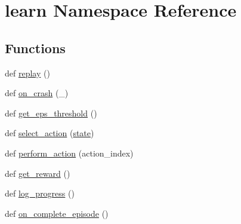 \hypertarget{namespacelearn}{}\section{learn Namespace Reference}
\label{namespacelearn}
\subsection*{Functions}
\begin{DoxyCompactItemize}
\item 
def \hyperlink{namespacelearn_a39889cb816ab9a6bc7a528ee4c8784db}{replay} ()
\item 
def \hyperlink{namespacelearn_ae0746217c771a7b43503a88b0a55c8c5}{on\+\_\+crash} (\+\_\+)
\item 
def \hyperlink{namespacelearn_ae05616fc87e970aa8283fc7223fb8753}{get\+\_\+eps\+\_\+threshold} ()
\item 
def \hyperlink{namespacelearn_a5dbccbd480a1c02fe1e4c1fc67a066cc}{select\+\_\+action} (\hyperlink{namespacelearn_a48d8007f4bd73948e2b7683cd736edfc}{state})
\item 
def \hyperlink{namespacelearn_a2734a6ee9a0aed781d4db3abc7d206fb}{perform\+\_\+action} (action\+\_\+index)
\item 
def \hyperlink{namespacelearn_a6b3b3e6dbffdbc5bbd5d685d582e66c6}{get\+\_\+reward} ()
\item 
def \hyperlink{namespacelearn_a88c4cfe2b9604f8e7b6a72715d86fb4e}{log\+\_\+progress} ()
\item 
def \hyperlink{namespacelearn_acf15a1858c52a77007bc14f91f461f0f}{on\+\_\+complete\+\_\+episode} ()
\end{DoxyCompactItemize}
